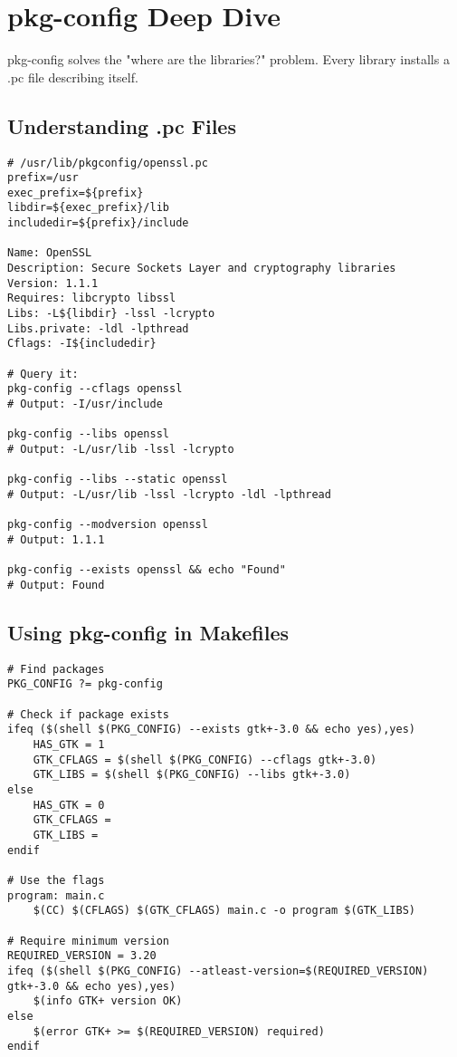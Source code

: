 \section{pkg-config Deep Dive}

pkg-config solves the "where are the libraries?" problem. Every library installs a .pc file describing itself.

\subsection{Understanding .pc Files}

\begin{lstlisting}
# /usr/lib/pkgconfig/openssl.pc
prefix=/usr
exec_prefix=${prefix}
libdir=${exec_prefix}/lib
includedir=${prefix}/include

Name: OpenSSL
Description: Secure Sockets Layer and cryptography libraries
Version: 1.1.1
Requires: libcrypto libssl
Libs: -L${libdir} -lssl -lcrypto
Libs.private: -ldl -lpthread
Cflags: -I${includedir}

# Query it:
pkg-config --cflags openssl
# Output: -I/usr/include

pkg-config --libs openssl
# Output: -L/usr/lib -lssl -lcrypto

pkg-config --libs --static openssl
# Output: -L/usr/lib -lssl -lcrypto -ldl -lpthread

pkg-config --modversion openssl
# Output: 1.1.1

pkg-config --exists openssl && echo "Found"
# Output: Found
\end{lstlisting}

\subsection{Using pkg-config in Makefiles}

\begin{lstlisting}
# Find packages
PKG_CONFIG ?= pkg-config

# Check if package exists
ifeq ($(shell $(PKG_CONFIG) --exists gtk+-3.0 && echo yes),yes)
    HAS_GTK = 1
    GTK_CFLAGS = $(shell $(PKG_CONFIG) --cflags gtk+-3.0)
    GTK_LIBS = $(shell $(PKG_CONFIG) --libs gtk+-3.0)
else
    HAS_GTK = 0
    GTK_CFLAGS =
    GTK_LIBS =
endif

# Use the flags
program: main.c
	$(CC) $(CFLAGS) $(GTK_CFLAGS) main.c -o program $(GTK_LIBS)

# Require minimum version
REQUIRED_VERSION = 3.20
ifeq ($(shell $(PKG_CONFIG) --atleast-version=$(REQUIRED_VERSION) gtk+-3.0 && echo yes),yes)
    $(info GTK+ version OK)
else
    $(error GTK+ >= $(REQUIRED_VERSION) required)
endif
\end{lstlisting}

